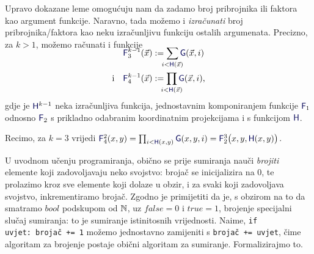 \begin{napomena}\label{nap:sumprodH}
Upravo dokazane leme omogućuju nam da zadamo broj pribrojnika ili faktora kao argument funkcije. Naravno, tada možemo i \emph{izračunati} broj pribrojnika\slash faktora kao neku izračunljivu funkciju ostalih argumenata. Precizno, za $k>1$, možemo računati i funkcije
\begin{align}
\SwapAboveDisplaySkip
    \f F_3^{k-1}(\vec x)&:=\sum_{\mathclap{i<\f H(\vec x)}}\f G(\vec x,i)\\
    \text{i\quad}\f F_4^{k-1}(\vec x)&:=\prod_{\mathclap{i<\f H(\vec x)}}\f G(\vec x,i)\text,
\end{align}
gdje je $\f H^{k-1}$ neka izračunljiva funkcija, jednostavnim komponiranjem funkcije $\f F_1$ odnosno $\f F_2$ s prikladno odabranim koordinatnim projekcijama i s funkcijom $\f H$.

Recimo, za $k=3$ vrijedi $\f F_4^2(x,y)=\prod_{i<\f H(x,y)}\f G(x,y,i)=\f F_2^3\bigl(x,y,\f H(x,y)\bigr)$.
\end{napomena}





U uvodnom učenju programiranja, obično se prije sumiranja nauči \emph{brojiti} elemente koji zadovoljavaju neko svojstvo: brojač se inicijalizira na $0$, te prolazimo kroz sve elemente koji dolaze u obzir, i za svaki koji zadovoljava svojstvo, inkrementiramo brojač. Zgodno je primijetiti da je, s obzirom na to da smatramo $bool$ podskupom od ${\mathbb N}$, uz $\mathit{false}=0$ i $\mathit{true}=1$, brojenje specijalni slučaj sumiranja: to je sumiranje istinitosnih vrijednosti. Naime, \texttt{if uvjet:\ brojač += 1} možemo jednostavno zamijeniti s \texttt{brojač += uvjet}, čime algoritam za brojenje postaje obični algoritam za sumiranje. Formalizirajmo to.

